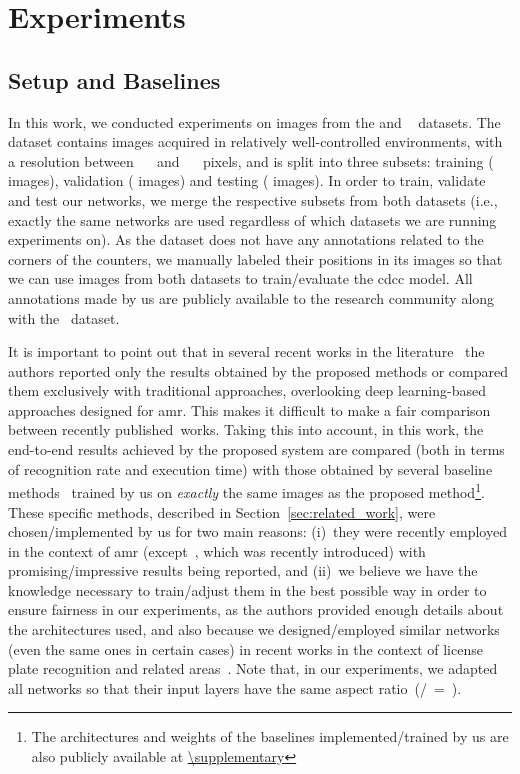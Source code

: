 \section{Experiments}
\label{sec:experiments}

\subsection{Setup and Baselines}
\label{sec:experiments-setup}

In this work, we conducted experiments on images from the \dataset and \ufpramr~\cite{laroca2019convolutional} datasets.
The \ufpramr dataset contains  images acquired in relatively well-controlled environments, with a resolution between ~~ and ~~ pixels, and is split into three subsets: training ( images), validation ( images) and testing ( images).
In order to train, validate and test our networks, we merge the respective subsets from both datasets (i.e., exactly the same networks are used regardless of which datasets we are running experiments on).
As the \ufpramr dataset does not have any annotations related to the corners of the counters, we manually labeled their positions in its  images so that we can use images from both datasets to train/evaluate the \gls*{cdcc} model.
All annotations made by us are publicly available to the research community along with the \dataset~dataset. 

It is important to point out that in several recent works in the literature~\cite{gomez2018cutting,koscevic2018automatic,calefati2019reading,liao2019reading} the authors reported only the results obtained by the proposed methods or compared them exclusively with traditional approaches, overlooking deep learning-based approaches designed for \gls*{amr}.
This makes it difficult to make a fair comparison between recently published~works.
Taking this into account, in this work, the end-to-end results achieved by the proposed system are compared (both in terms of recognition rate and execution time) with those obtained by several baseline methods~\cite{gomez2018cutting,calefati2019reading,liao2019reading,laroca2019convolutional,bochkovskiy2020yolov4} trained by us on \textit{exactly} the same images as the proposed method\footnote{The architectures and weights of the baselines implemented/trained by us are also publicly available at \url{\supplementary}}.
These specific methods, described in Section~\ref{sec:related_work}, were chosen/implemented by us for two main reasons: 
(i)~they were recently employed in the context of \gls*{amr} (except~\cite{bochkovskiy2020yolov4}, which was recently introduced) with promising/impressive results being reported, and (ii)~we believe we have the knowledge necessary to train/adjust them in the best possible way in order to ensure fairness in our experiments, as the authors provided enough details about the  architectures used, and also because we designed/employed similar networks (even the same ones in certain cases) in recent works in the context of license plate recognition and related areas~\cite{goncalves2018realtime,goncalves2019multitask,laroca2021efficient}.
Note that, in our experiments, we adapted all networks so that their input layers have the same aspect ratio~(/~=~).

